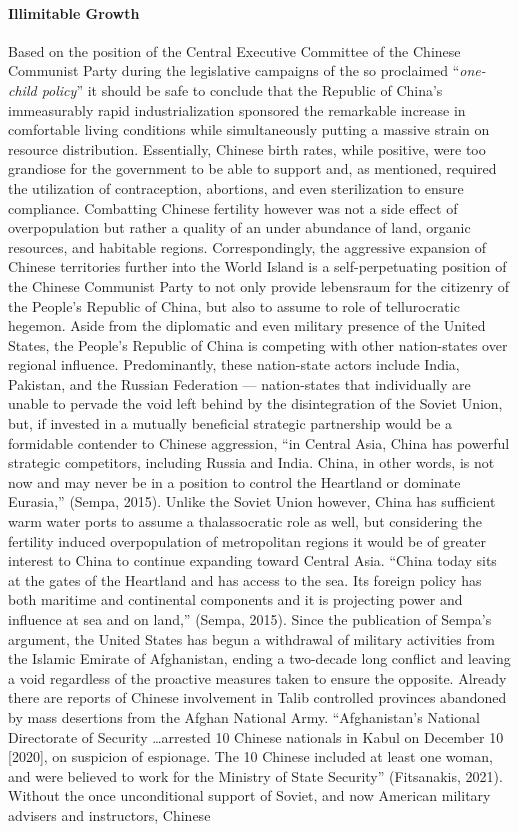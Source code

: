 \documentclass[12pt]{article}
\begin{document}
\paragraph{Illimitable Growth} Based on the position of the Central Executive Committee of the Chinese Communist Party during the legislative campaigns of the so proclaimed “\emph{one-child policy}” it should be safe to conclude that the Republic of China's immeasurably rapid industrialization sponsored the remarkable increase in comfortable living conditions while simultaneously putting a massive strain on resource distribution. Essentially, Chinese birth rates, while positive, were too grandiose for the government to be able to support and, as mentioned, required the utilization of contraception, abortions, and even sterilization to ensure compliance. Combatting Chinese fertility however was not a side effect of overpopulation but rather a quality of an under abundance of land, organic resources, and habitable regions. Correspondingly, the aggressive expansion of Chinese territories further into the World Island is a self-perpetuating position of the Chinese Communist Party to not only provide lebensraum for the citizenry of the People's Republic of China, but also to assume to role of tellurocratic hegemon. Aside from the diplomatic and even military presence of the United States, the People's Republic of China is competing with other nation-states over regional influence. Predominantly, these nation-state actors include India, Pakistan, and the Russian Federation — nation-states that individually are unable to pervade the void left behind by the disintegration of the Soviet Union, but, if invested in a mutually beneficial strategic partnership would be a formidable contender to Chinese aggression, “in Central Asia, China has powerful strategic competitors, including Russia and India. China, in other words, is not now and may never be in a position to control the Heartland or dominate Eurasia,” (Sempa, 2015). Unlike the Soviet Union however, China has sufficient warm water ports to assume a thalassocratic role as well, but considering the fertility induced overpopulation of metropolitan regions it would be of greater interest to China to continue expanding toward Central Asia. “China today sits at the gates of the Heartland and has access to the sea. Its foreign policy has both maritime and continental components and it is projecting power and influence at sea and on land,” (Sempa, 2015). Since the publication of Sempa's argument, the United States has begun a withdrawal of military activities from the Islamic Emirate of Afghanistan, ending a two-decade long conflict and leaving a void regardless of the proactive measures taken to ensure the opposite. Already there are reports of Chinese involvement in Talib controlled provinces abandoned by mass desertions from the Afghan National Army. “Afghanistan’s National Directorate of Security \dots arrested 10 Chinese nationals in Kabul on December 10 [2020], on suspicion of espionage. The 10 Chinese included at least one woman, and were believed to work for the Ministry of State Security” (Fitsanakis, 2021). Without the once unconditional support of Soviet, and now American military advisers and instructors, Chinese 
\end{document}
